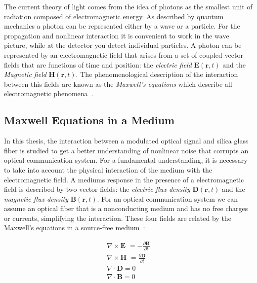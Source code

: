 The current theory of light comes from the idea of photons as the smallest unit of radiation composed of electromagnetic energy. As described by quantum mechanics a photon can be represented either by a wave or a particle. For the propagation and nonlinear interaction it is convenient to work in the wave picture, while at the detector you detect individual particles. A photon can be represented by  an electromagnetic field that arises from a set of coupled vector fields that are functions of time and position: the \emph{electric field} $\textbf{E}(\textbf{r},t)$  and the  \emph{Magnetic field} $\textbf{H}(\textbf{r},t)$. The phenomenological description of the interaction between this fields  are known as the \emph{Maxwell's equations} which describe all electromagnetic phenomena~\cite{FiberAgrawal}. 

\subsection{Maxwell Equations in a Medium}

In this thesis, the interaction between a modulated optical signal and silica glass fiber is studied to get a better understanding of nonlinear noise that corrupts an optical communication system. For a fundamental understanding, it is necessary to take into account the physical interaction of the medium with the electromagnetic field. A mediums response in the presence of a electromagnetic field is described by two vector fields: the \emph{electric flux density} $\textbf{D}(\textbf{r},t)$ and the \emph{magnetic flux density} $\textbf{B}(\textbf{r},t)$. For an optical communication system we can assume an optical fiber that is a nonconducting medium and has no free charges or currents, simplifying the interaction. These four fields are related by the  Maxwell's equations in a source-free medium~\cite{FundPhoto,FiberAgrawal}:


\begin{subequations}
\begin{gather}
\nabla \times \textbf{E }= -\frac{\partial \textbf{B}}{\partial t}\\
\nabla \times \textbf{H }= \frac{\partial \textbf{D}}{\partial t}\\
\nabla \cdot \textbf{D}= 0\\
\nabla \cdot \textbf{B}= 0
\label{eq:maxwell}
\end{gather}
\end{subequations}


